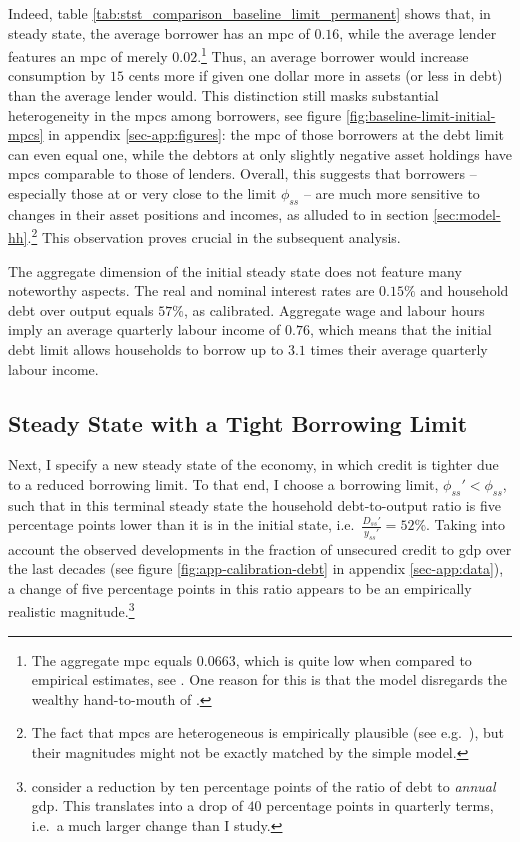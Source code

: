 \documentclass[12pt]{article} %
\numberwithin{equation}{section} %
\numberwithin{figure}{section}
\numberwithin{table}{section}
\begin{document}
Indeed, table \ref{tab:stst_comparison_baseline_limit_permanent} shows that, in steady state, the average borrower has an \Gls{mpc} of $0.16$, while the average lender features an \Gls{mpc} of merely $0.02$.\footnote{The aggregate \Gls{mpc} equals $0.0663$, which is quite low when compared to empirical estimates, see \textcite{kaplan2018}. One reason for this is that the model disregards the wealthy hand-to-mouth of \textcite{kaplan2014}.} Thus, an average borrower would increase consumption by $15$ cents more if given one dollar more in assets (or less in debt) than the average lender would. This distinction still masks substantial heterogeneity in the \Gls{mpc}s among borrowers, see figure \ref{fig:baseline-limit-initial-mpcs} in appendix \ref{sec-app:figures}: the \Gls{mpc} of those borrowers at the debt limit can even equal one, while the debtors at only slightly negative asset holdings have \Gls{mpc}s comparable to those of lenders. Overall, this suggests that borrowers -- especially those at or very close to the limit $\phi_{ss}$ -- are much more sensitive to changes in their asset positions and incomes, as alluded to in section \ref{sec:model-hh}.\footnote{The fact that \Gls{mpc}s are heterogeneous is empirically plausible (see e.g.~\cite{gross2002}), but their magnitudes might not be exactly matched by the simple model.} This observation proves crucial in the subsequent analysis.

The aggregate dimension of the initial steady state does not feature many noteworthy aspects. The real and nominal interest rates are $0.15\%$ and household debt over output equals $57\%$, as calibrated. Aggregate wage and labour hours imply an average quarterly labour income of $0.76$, which means that the initial debt limit allows households to borrow up to $3.1$ times their average quarterly labour income. 

\subsection{Steady State with a Tight Borrowing Limit}
\label{sec:limit-stst-tight}


Next, I specify a new steady state of the economy, in which credit is tighter due to a reduced borrowing limit. To that end, I choose a borrowing limit, $\phi_{ss}' < \phi_{ss}$, such that in this terminal steady state the household debt-to-output ratio is five percentage points lower than it is in the initial state, i.e.~$\frac{D_{ss}'}{y_{ss}'} = 52\%$. Taking into account the observed developments in the fraction of unsecured credit to \Gls{gdp} over the last decades (see figure \ref{fig:app-calibration-debt} in appendix \ref{sec-app:data}), a change of five percentage points in this ratio appears to be an empirically realistic magnitude.\footnote{\textcite{gl2017} consider a reduction by ten percentage points of the ratio of debt to \textit{annual} \Gls{gdp}. This translates into a drop of $40$ percentage points in quarterly terms, i.e.~a much larger change than I study.} 
\end{document}

